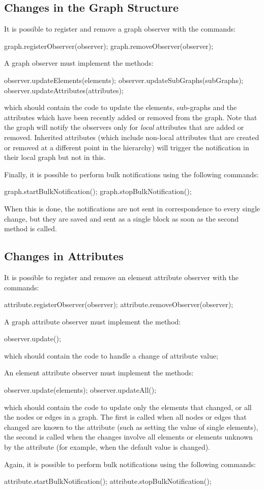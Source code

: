 \subsection{Changes in the Graph Structure}
It is possible to register and remove a graph observer with the commands:
\begin{java}
graph.registerObserver(observer);
graph.removeObserver(observer);
\end{java}

A graph observer must implement the methods:
\begin{java}
observer.updateElements(elements);
observer.updateSubGraphs(subGraphs);
observer.updateAttributes(attributes);
\end{java}
which should contain the code to update the elements, sub-graphs and the attributes which have been recently added or removed from the graph. Note that the graph will notify the observers only for \emph{local} attributes that are added or removed. Inherited attributes (which include non-local attributes that are created or removed at a different point in the hierarchy) will trigger the notification in their local graph but not in this. 

Finally, it is possible to perform bulk notifications using the following commands:
\begin{java}
graph.startBulkNotification();
graph.stopBulkNotification();
\end{java}
When this is done, the notifications are not sent in correspondence to every single change, but they are saved and sent as a single block as soon as the second method is called.


\subsection{Changes in Attributes}
It is possible to register and remove an element attribute observer with the commands:
\begin{java}
attribute.registerObserver(observer);
attribute.removeObserver(observer);
\end{java}

A graph attribute observer must implement the method:
\begin{java}
observer.update();
\end{java}
which should contain the code to handle a change of attribute value;

An element attribute observer must implement the methods:
\begin{java}
observer.update(elements);
observer.updateAll();
\end{java}
which should contain the code to update only the elements that changed, or all the nodes or edges in a graph. The first is called when all nodes or edges that changed are known to the attribute (such as setting the value of single elements), the second is called when the changes involve all elements or elements unknown by the attribute (for example, when the default value is changed).

Again, it is possible to perform bulk notifications using the following commands:
\begin{java}
attribute.startBulkNotification();
attribute.stopBulkNotification();
\end{java}


